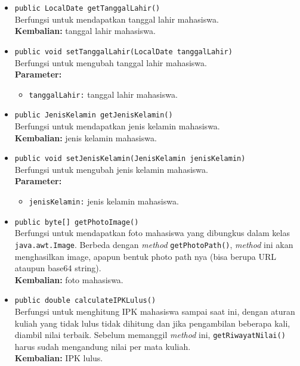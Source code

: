 \begin{itemize}
	\item \texttt{public LocalDate getTanggalLahir()}\\
	Berfungsi untuk mendapatkan tanggal lahir mahasiswa.\\
	\textbf{Kembalian:} tanggal lahir mahasiswa.
	
	\item \texttt{public void setTanggalLahir(LocalDate tanggalLahir)}\\
	Berfungsi untuk mengubah tanggal lahir mahasiswa.\\
        \textbf{Parameter:}
		\begin{itemize}
			\item \texttt{tanggalLahir:} tanggal lahir mahasiswa.
		\end{itemize}
		
	\item \texttt{public JenisKelamin getJenisKelamin()}\\
	Berfungsi untuk mendapatkan jenis kelamin mahasiswa.\\
	\textbf{Kembalian:} jenis kelamin mahasiswa.
	
	\item \texttt{public void setJenisKelamin(JenisKelamin jenisKelamin)}\\
	Berfungsi untuk mengubah jenis kelamin mahasiswa.\\
        \textbf{Parameter:}
		\begin{itemize}
			\item \texttt{jenisKelamin:} jenis kelamin mahasiswa.
		\end{itemize}
		
	\item \texttt{public byte[] getPhotoImage()}\\
	Berfungsi untuk mendapatkan foto mahasiswa yang dibungkus dalam kelas \texttt{java.awt.Image}. Berbeda dengan \textit{method} \texttt{getPhotoPath()}, \textit{method} ini akan menghasilkan image, apapun bentuk photo path nya (bisa berupa URL ataupun base64 string).\\
	\textbf{Kembalian:} foto mahasiswa.
		
	\item \texttt{public double calculateIPKLulus()}\\
	Berfungsi untuk menghitung IPK mahasiswa sampai saat ini, dengan aturan kuliah yang tidak lulus tidak dihitung dan jika pengambilan beberapa kali, diambil nilai terbaik. Sebelum memanggil \textit{method} ini, \texttt{getRiwayatNilai()} harus sudah mengandung nilai per mata kuliah.\\
	\textbf{Kembalian:} IPK lulus.
		

\end{itemize}

